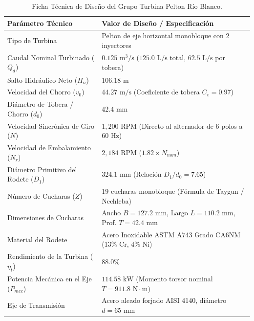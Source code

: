 \documentclass[11pt,a4paper]{report}
\begin{document}
\begin{table}[H]
\centering
\small
\begin{tabularx}{\linewidth}{lX}
\toprule
\textbf{Parámetro Técnico} & \textbf{Valor de Diseño / Especificación} \\
\midrule
Tipo de Turbina & Pelton de eje horizontal monobloque con 2 inyectores \\
Caudal Nominal Turbinado ($Q_d$) & $0.125\text{ m}^3/\text{s}$ ($125.0\text{ L/s}$ total, $62.5\text{ L/s}$ por tobera) \\
Salto Hidráulico Neto ($H_n$) & $106.18\text{ m}$ \\
Velocidad del Chorro ($v_0$) & $44.27\text{ m/s}$ (Coeficiente de tobera $C_v = 0.97$) \\
Diámetro de Tobera / Chorro ($d_0$) & $42.4\text{ mm}$ \\
Velocidad Sincrónica de Giro ($N$) & $1,200\text{ RPM}$ (Directo al alternador de 6 polos a 60 Hz) \\
Velocidad de Embalamiento ($N_r$) & $2,184\text{ RPM}$ ($1.82 \times N_{nom}$) \\
Diámetro Primitivo del Rodete ($D_1$) & $324.1\text{ mm}$ (Relación $D_1/d_0 = 7.65$) \\
Número de Cucharas ($Z$) & 19 cucharas monobloque (Fórmula de Taygun / Nechleba) \\
Dimensiones de Cucharas & Ancho $B = 127.2\text{ mm}$, Largo $L = 110.2\text{ mm}$, Prof. $T = 42.4\text{ mm}$ \\
Material del Rodete & Acero Inoxidable ASTM A743 Grado CA6NM (13\% Cr, 4\% Ni) \\
Rendimiento de la Turbina ($\eta_t$) & $88.0\%$ \\
Potencia Mecánica en el Eje ($P_{mec}$) & $114.58\text{ kW}$ (Momento torsor nominal $T = 911.8\text{ N}\cdot\text{m}$) \\
Eje de Transmisión & Acero aleado forjado AISI 4140, diámetro $d = 65\text{ mm}$ \\
\bottomrule
\end{tabularx}
\caption{Ficha Técnica de Diseño del Grupo Turbina Pelton Río Blanco.}
\label{tab:pelton}
\end{table}
\end{document}
